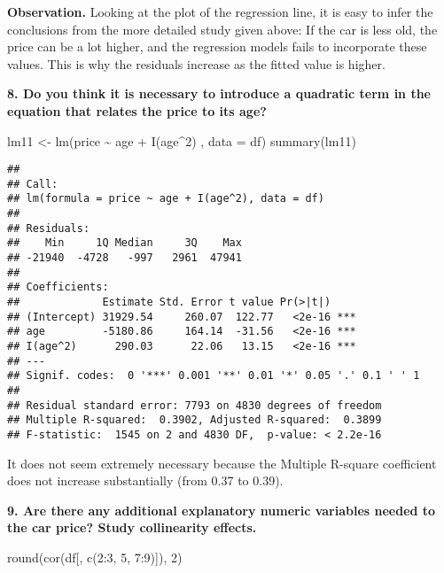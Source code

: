 \documentclass[
]{article}
\newenvironment{Shaded}{\begin{snugshade}}{\end{snugshade}}
\newcommand{\AttributeTok}[1]{\textcolor[rgb]{0.77,0.63,0.00}{#1}}
\newcommand{\DecValTok}[1]{\textcolor[rgb]{0.00,0.00,0.81}{#1}}
\newcommand{\FunctionTok}[1]{\textcolor[rgb]{0.00,0.00,0.00}{#1}}
\newcommand{\NormalTok}[1]{#1}
\newcommand{\OtherTok}[1]{\textcolor[rgb]{0.56,0.35,0.01}{#1}}
\newcommand{\SpecialCharTok}[1]{\textcolor[rgb]{0.00,0.00,0.00}{#1}}
\begin{document}
\textbf{Observation.} Looking at the plot of the regression line, it is
easy to infer the conclusions from the more detailed study given above:
If the car is less old, the price can be a lot higher, and the
regression models fails to incorporate these values. This is why the
residuals increase as the fitted value is higher.

\newpage

\textbf{8. Do you think it is necessary to introduce a quadratic term in the equation that relates the price
to its age?}

\begin{Shaded}
\begin{Highlighting}[]
\NormalTok{lm11 }\OtherTok{\textless{}{-}} \FunctionTok{lm}\NormalTok{(price }\SpecialCharTok{\textasciitilde{}}\NormalTok{ age }\SpecialCharTok{+} \FunctionTok{I}\NormalTok{(age}\SpecialCharTok{\^{}}\DecValTok{2}\NormalTok{) , }\AttributeTok{data =}\NormalTok{ df)}
\FunctionTok{summary}\NormalTok{(lm11)}
\end{Highlighting}
\end{Shaded}

\begin{verbatim}
## 
## Call:
## lm(formula = price ~ age + I(age^2), data = df)
## 
## Residuals:
##    Min     1Q Median     3Q    Max 
## -21940  -4728   -997   2961  47941 
## 
## Coefficients:
##             Estimate Std. Error t value Pr(>|t|)    
## (Intercept) 31929.54     260.07  122.77   <2e-16 ***
## age         -5180.86     164.14  -31.56   <2e-16 ***
## I(age^2)      290.03      22.06   13.15   <2e-16 ***
## ---
## Signif. codes:  0 '***' 0.001 '**' 0.01 '*' 0.05 '.' 0.1 ' ' 1
## 
## Residual standard error: 7793 on 4830 degrees of freedom
## Multiple R-squared:  0.3902, Adjusted R-squared:  0.3899 
## F-statistic:  1545 on 2 and 4830 DF,  p-value: < 2.2e-16
\end{verbatim}

It does not seem extremely necessary because the Multiple R-square
coefficient does not increase substantially (from 0.37 to 0.39).

\newpage

\textbf{9. Are there any additional explanatory numeric variables needed to the car price? Study
collinearity effects.}

\begin{Shaded}
\begin{Highlighting}[]
\FunctionTok{round}\NormalTok{(}\FunctionTok{cor}\NormalTok{(df[, }\FunctionTok{c}\NormalTok{(}\DecValTok{2}\SpecialCharTok{:}\DecValTok{3}\NormalTok{, }\DecValTok{5}\NormalTok{, }\DecValTok{7}\SpecialCharTok{:}\DecValTok{9}\NormalTok{)]), }\DecValTok{2}\NormalTok{)}
\end{Highlighting}
\end{Shaded}
\end{document}
